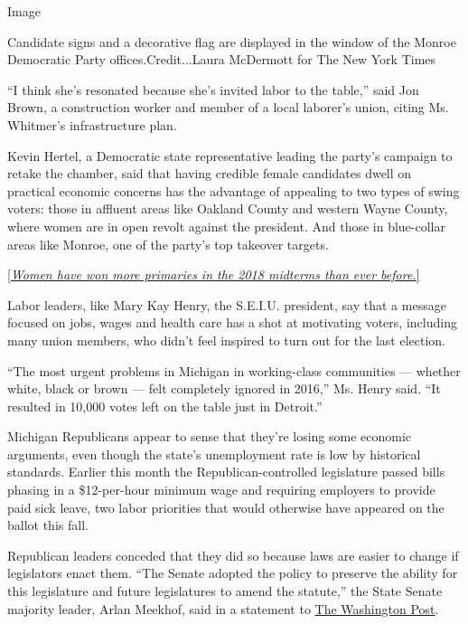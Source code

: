 Image

Candidate signs and a decorative flag are displayed in the window of the
Monroe Democratic Party offices.Credit...Laura McDermott for The New
York Times

``I think she's resonated because she's invited labor to the table,''
said Jon Brown, a construction worker and member of a local laborer's
union, citing Ms. Whitmer's infrastructure plan.

Kevin Hertel, a Democratic state representative leading the party's
campaign to retake the chamber, said that having credible female
candidates dwell on practical economic concerns has the advantage of
appealing to two types of swing voters: those in affluent areas like
Oakland County and western Wayne County, where women are in open revolt
against the president. And those in blue-collar areas like Monroe, one
of the party's top takeover targets.

\href{https://www.nytimes.com/interactive/2018/09/14/us/women-primaries-house-senate-governor.html}{{[}}\emph{\href{https://www.nytimes.com/interactive/2018/09/14/us/women-primaries-house-senate-governor.html}{Women
have won more primaries in the 2018 midterms than ever
before.}}\href{https://www.nytimes.com/interactive/2018/09/14/us/women-primaries-house-senate-governor.html}{{]}}

Labor leaders, like Mary Kay Henry, the S.E.I.U. president, say that a
message focused on jobs, wages and health care has a shot at motivating
voters, including many union members, who didn't feel inspired to turn
out for the last election.

``The most urgent problems in Michigan in working-class communities ---
whether white, black or brown --- felt completely ignored in 2016,'' Ms.
Henry said. ``It resulted in 10,000 votes left on the table just in
Detroit.''

Michigan Republicans appear to sense that they're losing some economic
arguments, even though the state's unemployment rate is low by
historical standards. Earlier this month the Republican-controlled
legislature passed bills phasing in a \$12-per-hour minimum wage and
requiring employers to provide paid sick leave, two labor priorities
that would otherwise have appeared on the ballot this fall.

Republican leaders conceded that they did so because laws are easier to
change if legislators enact them. ``The Senate adopted the policy to
preserve the ability for this legislature and future legislatures to
amend the statute,'' the State Senate majority leader, Arlan Meekhof,
said in a statement to
\href{https://www.washingtonpost.com/business/2018/09/10/they-have-taken-away-our-vote-michigan-approves-minimum-wage-hike-paid-sick-leave-setting-up-clash/?utm_term=.745b2edafa2d}{The
Washington Post}.

